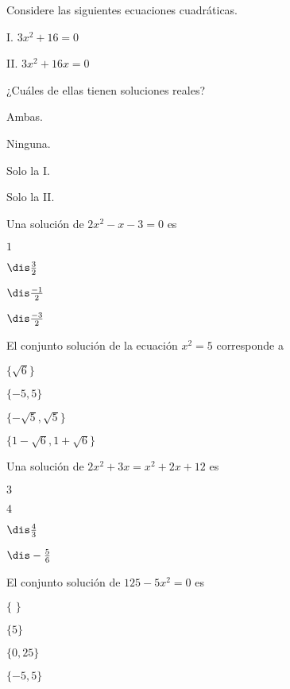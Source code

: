 \documentclass[12pt, fleqn]{article}
\begin{document}
\pagebreak

\item Considere las siguientes ecuaciones cuadráticas.
\vp

\begin{tcolorbox}
\bc
\benu
\item[I.] $3x^2+16=0$
\item[II.] $3x^2+16x=0$
\eenu
\ec
\end{tcolorbox}

¿Cuáles de ellas tienen soluciones reales?

\benu
\item[] \opc Ambas.
\item[] \opc Ninguna.
\item[] \opc Solo la I.
\item[] \opc Solo la II.
\eenu
\vs

\item Una solución de $2x^2-x-3=0$ es \vp

\benu
\item[] \opc $1$
\item[] \opc $\dis\frac32$
\item[] \opc $\dis\frac{-1}{2}$
\item[] \opc $\dis\frac{-3}{2}$
\eenu
\vs

\item El conjunto solución de la ecuación $x^2=5$ corresponde a
\vp

\benu
\item[] \opc $\{\sqrt6\}$
\item[] \opc $\{-5,5\}$
\item[] \opc $\{-\sqrt5,\sqrt5\}$
\item[] \opc $\{1-\sqrt6,1+\sqrt6\}$
\eenu
\vp

\item Una solución de $2x^2+3x=x^2+2x+12$ es
\vp

\benu
\item[] \opc $3$
\item[] \opc $4$
\item[] \opc $\dis\frac43$
\item[] \opc $\dis-\frac{5}{6}$
\eenu
\vs

\pagebreak

\item El conjunto solución de  $125-5x^2=0$ es
\vp

\benu
\item[] \opc $\{\,\,\}$ \vp
\item[] \opc $\{5\}$ \vp
\item[] \opc $\{0,25\}$ \vp
\item[] \opc $\{-5,5\}$
\eenu
\vs
\end{document}
